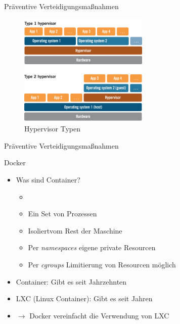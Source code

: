 \begin{frame}{Präventive Verteidigungsmaßnahmen}
        \begin{figure}
                \centering
                \includegraphics[width=0.55\textwidth]{assets/hypervisor}
                \caption{Hypervisor Typen \footnotemark}
        \end{figure}

\end{frame}

\begin{frame}{Präventive Verteidigungsmaßnahmen}
        \begin{block}{Docker}
                \begin{itemize}[<+->]
                        \item Was sind Container?
                        \begin{itemize}[<+->]
                                \item \textbf{}
                                \item Ein Set von Prozessen
                                \item Isoliert\footnotemark vom Rest der Maschine
                                \item Per \textit{namespaces} eigene private Resourcen
                                \item Per \textit{cgroups} Limitierung von Resourcen möglich
                        \end{itemize}
                        \item Container: Gibt es seit Jahrzehnten
                        \item LXC (Linux Container): Gibt es seit Jahren
                        \item $\rightarrow$ Docker vereinfacht die Verwendung von LXC 
                \end{itemize}
        \end{block}

\end{frame}

